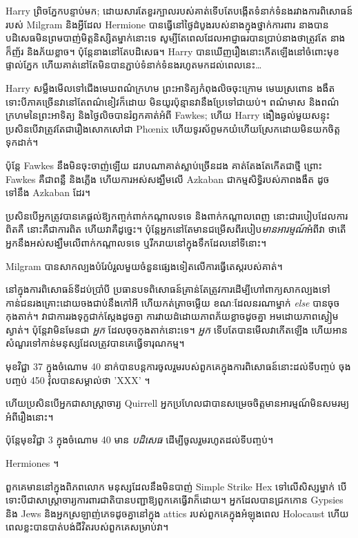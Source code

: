 {{{{{{{Harry ព្រិចភ្នែកបន្ទាប់មក; ដោយសារតែខួរក្បាលរបស់គាត់ទើបតែបង្កើតទំនាក់ទំនងរវាងការពិសោធន៍របស់ Milgram និងអ្វីដែល Hermione បានធ្វើនៅថ្ងៃដំបូងរបស់នាងក្នុងថ្នាក់ការពារ នាងបានបដិសេធមិនព្រមបាញ់មិត្តនិស្សិតម្នាក់នោះទេ សូម្បីតែពេលដែលអាជ្ញាធរបានប្រាប់នាងថាត្រូវតែ នាងក៏ញ័រ និងភ័យខ្លាច។ ប៉ុន្តែនាងនៅតែបដិសេធ។ Harry បាន​ឃើញ​រឿង​នោះ​កើត​ឡើង​នៅ​ចំពោះ​មុខ​ផ្ទាល់​ភ្នែក ហើយ​គាត់​នៅ​តែ​មិន​បាន​ភ្ជាប់​ទំនាក់ទំនង​រហូត​មក​ដល់​ពេល​នេះ…

Harry សម្លឹងមើលទៅជើងមេឃពណ៌ក្រហម ព្រះអាទិត្យកំពុងលិចចុះក្រោម មេឃស្រពោន ងងឹត ទោះបីភាគច្រើនវានៅតែពណ៌ខៀវក៏ដោយ មិនយូរប៉ុន្មានវានឹងប្រែទៅជាយប់។ ពណ៌មាស និងពណ៌ក្រហមនៃព្រះអាទិត្យ និងថ្ងៃលិចបានរំឭកគាត់អំពី Fawkes; ហើយ Harry ងឿងឆ្ងល់មួយសន្ទុះ ប្រសិនបើវាត្រូវតែជារឿងសោកសៅជា Phœnix ហើយទូរស័ព្ទមកយំហើយស្រែកដោយមិនយកចិត្តទុកដាក់។

ប៉ុន្តែ Fawkes នឹងមិនចុះចាញ់ឡើយ ដរាបណាគាត់ស្លាប់ច្រើនដង គាត់តែងតែកើតជាថ្មី ព្រោះ Fawkes គឺជាពន្លឺ និងភ្លើង ហើយការអស់សង្ឃឹមលើ Azkaban ជាកម្មសិទ្ធិរបស់ភាពងងឹត ដូចទៅនឹង Azkaban ដែរ។

ប្រសិនបើអ្នកត្រូវបានគេផ្តល់ឱ្យកញ្ចក់ពាក់កណ្តាលទទេ និងពាក់កណ្តាលពេញ នោះជារបៀបដែលការពិតគឺ នោះគឺជាការពិត ហើយវាគឺដូច្នេះ។ ប៉ុន្តែអ្នកនៅតែមានជម្រើសពីរបៀប\emph{មានអារម្មណ៍}អំពីវា ថាតើអ្នកនឹងអស់សង្ឃឹមលើពាក់កណ្តាលទទេ ឬរីករាយនៅក្នុងទឹកដែលនៅទីនោះ។

Milgram បានសាកល្បងបំរែបំរួលមួយចំនួនផ្សេងទៀតលើការធ្វើតេស្តរបស់គាត់។

នៅក្នុងការពិសោធន៍ទីដប់ប្រាំបី ប្រធានបទពិសោធន៍គ្រាន់តែត្រូវការដើម្បីហៅពាក្យសាកល្បងទៅកាន់ជនរងគ្រោះដោយចងជាប់នឹងកៅអី ហើយកត់ត្រាចម្លើយ ខណៈដែលនរណាម្នាក់ \emph{else} បានចុចកុងតាក់។ វាជាការរងទុក្ខជាក់ស្តែងដូចគ្នា ការវាយដំដោយភាពភ័យខ្លាចដូចគ្នា អមដោយភាពស្ងៀមស្ងាត់។ ប៉ុន្តែវាមិនមែនជា \emph{អ្នក} ដែលចុចកុងតាក់នោះទេ។ \emph{អ្នក} ទើបតែបានមើលវាកើតឡើង ហើយអានសំណួរទៅកាន់មនុស្សដែលត្រូវបានគេធ្វើទារុណកម្ម។

មុខវិជ្ជា 37 ក្នុងចំណោម 40 នាក់បានបន្តការចូលរួមរបស់ពួកគេក្នុងការពិសោធន៍នោះដល់ទីបញ្ចប់ ចុងបញ្ចប់ 450 វ៉ុលបានសម្គាល់ថា 'XXX' ។

ហើយប្រសិនបើអ្នកជាសាស្រ្តាចារ្យ Quirrell អ្នកប្រហែលជាបានសម្រេចចិត្តមានអារម្មណ៍មិនសមរម្យអំពីរឿងនោះ។

ប៉ុន្តែមុខវិជ្ជា 3 ក្នុងចំណោម 40 មាន \emph{បដិសេធ} ដើម្បីចូលរួមរហូតដល់ទីបញ្ចប់។

Hermiones ។

ពួកគេមាននៅក្នុងពិភពលោក មនុស្សដែលនឹងមិនបាញ់ Simple Strike Hex ទៅលើសិស្សម្នាក់ បើទោះបីជាសាស្រ្តាចារ្យការពារជាតិបានបញ្ជាឱ្យពួកគេធ្វើវាក៏ដោយ។ អ្នកដែលបានជ្រកកោន Gypsies និង Jews និងអ្នកស្រឡាញ់ភេទដូចគ្នានៅក្នុង attics របស់ពួកគេក្នុងអំឡុងពេល Holocaust ហើយពេលខ្លះបានបាត់បង់ជីវិតរបស់ពួកគេសម្រាប់វា។

}}}}}}}
